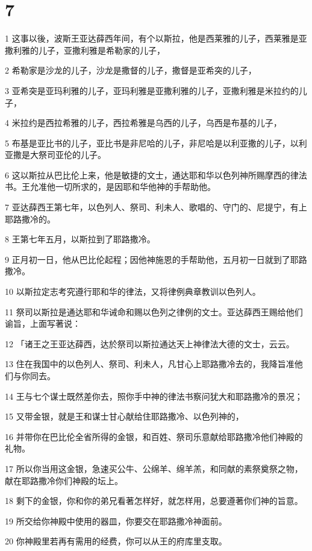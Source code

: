 \chapter{7}

\par 1 这事以後，波斯王亚达薛西年间，有个以斯拉，他是西莱雅的儿子，西莱雅是亚撒利雅的儿子，亚撒利雅是希勒家的儿子，
\par 2 希勒家是沙龙的儿子，沙龙是撒督的儿子，撒督是亚希突的儿子，
\par 3 亚希突是亚玛利雅的儿子，亚玛利雅是亚撒利雅的儿子，亚撒利雅是米拉约的儿子，
\par 4 米拉约是西拉希雅的儿子，西拉希雅是乌西的儿子，乌西是布基的儿子，
\par 5 布基是亚比书的儿子，亚比书是非尼哈的儿子，非尼哈是以利亚撒的儿子，以利亚撒是大祭司亚伦的儿子。
\par 6 这以斯拉从巴比伦上来，他是敏捷的文士，通达耶和华以色列神所赐摩西的律法书。王允准他一切所求的，是因耶和华他神的手帮助他。
\par 7 亚达薛西王第七年，以色列人、祭司、利未人、歌唱的、守门的、尼提宁，有上耶路撒冷的。
\par 8 王第七年五月，以斯拉到了耶路撒冷。
\par 9 正月初一日，他从巴比伦起程；因他神施恩的手帮助他，五月初一日就到了耶路撒冷。
\par 10 以斯拉定志考究遵行耶和华的律法，又将律例典章教训以色列人。
\par 11 祭司以斯拉是通达耶和华诫命和赐以色列之律例的文士。亚达薛西王赐给他们谕旨，上面写著说：
\par 12 「诸王之王亚达薛西，达於祭司以斯拉通达天上神律法大德的文士，云云。
\par 13 住在我国中的以色列人、祭司、利未人，凡甘心上耶路撒冷去的，我降旨准他们与你同去。
\par 14 王与七个谋士既然差你去，照你手中神的律法书察问犹大和耶路撒冷的景况；
\par 15 又带金银，就是王和谋士甘心献给住耶路撒冷、以色列神的，
\par 16 并带你在巴比伦全省所得的金银，和百姓、祭司乐意献给耶路撒冷他们神殿的礼物。
\par 17 所以你当用这金银，急速买公牛、公绵羊、绵羊羔，和同献的素祭奠祭之物，献在耶路撒冷你们神殿的坛上。
\par 18 剩下的金银，你和你的弟兄看著怎样好，就怎样用，总要遵著你们神的旨意。
\par 19 所交给你神殿中使用的器皿，你要交在耶路撒冷神面前。
\par 20 你神殿里若再有需用的经费，你可以从王的府库里支取。
